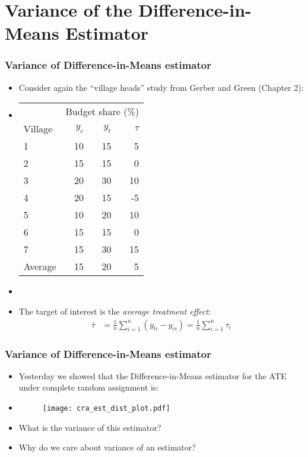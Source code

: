 \documentclass[table, xcolor={dvipsnames}, 9pt]{beamer}
\theoremstyle{newstyle}
\begin{document}
\section{Variance of the Difference-in-Means Estimator}
\begin{frame}
\frametitle{Variance of Difference-in-Means estimator} 
\begin{itemize}
\item Consider again the ``village heads'' study from Gerber and Green (Chapter 2): \pause 
\item[]
\begin{center}
\begin{tabular}{l|rrr} \hline
& \multicolumn{3}{c}{Budget share (\%)} \\
Village &$y_{c}$& $y_{t}$& $\tau$  \\ \hline
1& 10 & 15  & 5  \\
2& 15 & 15  & 0   \\ 
3& 20 & 30  & 10   \\
4& 20 & 15  & -5   \\
5& 10 & 20  & 10   \\
6& 15 & 15  & 0   \\
7& 15 & 30  & 15   \\ \hline
Average & 15 & 20 & 5  \\ \hline
\end{tabular}
\end{center} \pause
\item[]
\item The target of interest is the \textit{average treatment effect}: \pause
\begin{align*}
\bar{\tau} & = \frac{1}{n}\sum \limits_{i = 1}^{n} \left(y_{ti} - y_{ci}\right) = \frac{1}{n}\sum \limits_{i = 1}^{n} \tau_i
\end{align*}
\end{itemize}
\end{frame}
\begin{frame}
\frametitle{Variance of Difference-in-Means estimator} 
\begin{itemize}
\item Yesterday we showed that the Difference-in-Means estimator for the ATE under complete random assignment is: \pause 
\item[]
\begin{figure}[H]
\texttt{[image: cra\_est\_dist\_plot.pdf]}
\end{figure} \pause
\item What is the variance of this estimator? \pause 
\item Why do we care about variance of an estimator?
\end{itemize}
\end{frame}
\end{document}
